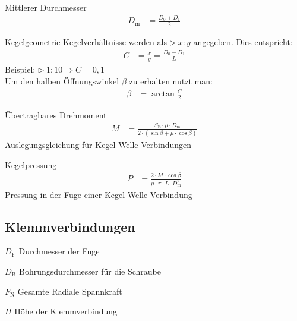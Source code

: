 \begin{eeqn}{Mittlerer Durchmesser}
	\begin{align}
		D_\text{m} &= \frac{D_0+D_1}{2}
	\end{align}

\end{eeqn}

\begin{eeqn}{Kegelgeometrie}
	Kegelverhältnisse werden als $\rhd\;x:y$ angegeben. Dies entspricht:
	\begin{align}
		C & = \frac{x}{y} = \frac{D_0-D_1}{L}
	\end{align}
	Beispiel: $\rhd\; 1:10 \Rightarrow C=0,1$ \\
	Um den halben Öffnungswinkel $\beta$ zu erhalten nutzt man:
	\begin{align}
		\beta & = \arctan \frac{C}{2}
	\end{align}
\end{eeqn}

\begin{eeqn}{Übertragbares Drehmoment}
	\begin{align}
		M &= \frac{S_\text{E} \cdot \mu \cdot D_\text{m}}{2\cdot (\sin \beta + \mu \cdot \cos \beta)}
	\end{align}
	Auslegungsgleichung für Kegel-Welle Verbindungen
\end{eeqn}

\begin{eeqn}{Kegelpressung}
	\begin{align}
		P &= \frac{2\cdot M \cdot \cos \beta}{\mu \cdot \pi \cdot L \cdot D_\text{m}^2}
	\end{align}
	Pressung in der Fuge einer Kegel-Welle Verbindung
\end{eeqn}
\vfill
\pagebreak

\subsection{Klemmverbindungen}
\begin{vardef}
	\item[$D_\text{F}$] Durchmesser der Fuge
	\item[$D_\text{B}$] Bohrungsdurchmesser für die Schraube
	\item[$F_\text{N}$] Gesamte Radiale Spannkraft
	\item[$H$] Höhe der Klemmverbindung
\end{vardef}

